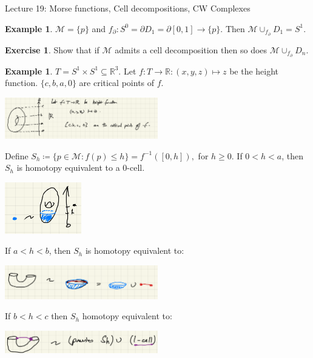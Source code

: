 \documentclass[10pt]{article}
\theoremstyle{plain}
\theoremstyle{definition}
\newtheorem{exmp}[thm]{Example} %
\newtheorem{exercise}[thm]{Exercise}
\newcommand{\Real}{\mathbb{R}}
\newcommand{\man}{\mathcal{M}}
\newcommand{\inter}{\left[0,1\right]}
\begin{document}
\begin{section}{Lecture 19: Morse functions, Cell decompositions, CW Complexes}
\begin{exmp}
     $\man = \{p\}$ and $f_\partial : S^0 = \partial D_1 = \partial \inter \to \{p\}.$ Then $\man \cup_{f_\partial}D_1 = S^1$.
\end{exmp}

\begin{exercise}
    Show that if $\man$ admits a cell decomposition then so does $\man \cup_{f_\partial} D_n$.
\end{exercise}

\begin{exmp}
    $T = S^1 \times S^1 \subseteq \Real^3$. Let $f:T\to \Real:(x,y,z)\mapsto z$ be the height function. $\{c,b,a,0\}$ are critical points of $f$.
    \begin{center}
        \includegraphics[width=0.5\textwidth]{TorusCellDecomposition.png}
    \end{center}
    Define $S_h \coloneqq \{p\in\man : f(p) \leq h\} = f^{-1}([0,h]), $ for $h\geq 0$. If $0<h<a$, then $S_h$ is homotopy equivalent to a 0-cell.
    \begin{center}
        \includegraphics[width=0.25\textwidth]{MorseTorusTrivialHomotopy.png}
    \end{center}
    If $a<h<b$, then $S_h$ is homotopy equivalent to:    
    \begin{center}
        \includegraphics[width=0.5\textwidth]{MorseTorusHomotopyOneCell.png}
    \end{center}
    If $b<h<c$ then $S_h$ homotopy equivalent to:
    \begin{center}
        \includegraphics[width = 0.5\textwidth]{MorseTorusHomotopyOneCellWithZeroCell.png}
    \end{center}

\end{exmp}
\end{section}
\end{document}

